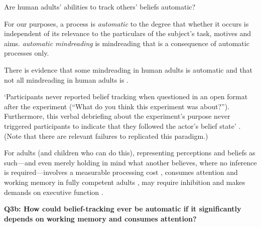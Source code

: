 \documentclass[12pt]{extarticle}
\begin{document}
\begin{multicols*}{3}
Are human adults’ abilities to track others’ beliefs automatic?

For our purposes, a process is \emph{automatic} to the degree that whether it occurs is independent of
its relevance to the particulars of the subject's task, motives and aims.  \emph{automatic mindreading} is mindreading that is a consequence of
automatic processes only.


There is evidence that some mindreading in human adults is
 automatic
\citep[e.g.][]{kovacs_social_2010,Schneider:2011fk,Wel:2013uq} and
that not all mindreading in human adults is
\citep{apperly:2008_back,apperly_why_2010,Wel:2013uq}.

‘Participants never reported belief tracking when questioned in an open format after the experiment
(“What do you think this experiment was about?”). Furthermore, this verbal debriefing about the
experiment’s purpose never triggered participants to indicate that they followed the actor’s belief
state’ \citep[p.~2]{Schneider:2011fk}.
(Note that there are relevant failures to replicated this paradigm.)


For adults (and children who can do this),
representing perceptions and beliefs as such---and even merely holding in mind
what another believes, where no inference is required---involves a measurable
processing cost \citep{apperly:2008_back,apperly:2010_limits}, consumes attention
and working memory in fully competent adults \citealp{Apperly:2009cc,
lin:2010_reflexively, McKinnon:2007rr},  may require inhibition \citep{bull:2008_role}
and makes demands on executive function \citep{apperly:2004_frontal,samson:2005_seeing}.

\textbf{Q3b: How could
belief-tracking ever be automatic if it significantly depends on working memory and consumes attention?}



\footnotesize


\end{multicols*}
\end{document}
